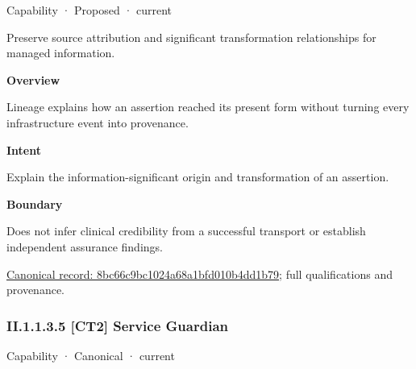 \label{element:8bc66c9bc1024a68a1bfd010b4dd1b79}
{\small Capability · Proposed · current}\par

Preserve source attribution and significant transformation relationships for managed information.



\textbf{Overview}



Lineage explains how an assertion reached its present form without turning every infrastructure event into provenance.



\textbf{Intent}



Explain the information-significant origin and transformation of an assertion.



\textbf{Boundary}



Does not infer clinical credibility from a successful transport or establish independent assurance findings.


{\footnotesize \href{../../../../continuum/strategy/capability/8bc66c9bc1024a68a1bfd010b4dd1b79.md}{Canonical record: 8bc66c9bc1024a68a1bfd010b4dd1b79}; full qualifications and provenance.}\par
\subsubsection*{II.1.1.3.5 [CT2] Service Guardian}
\label{navigation:II.1.1.3.5}

\label{element:d767f12f9b1c495883216ace464ee1c2}
{\small Capability · Canonical · current}\par

